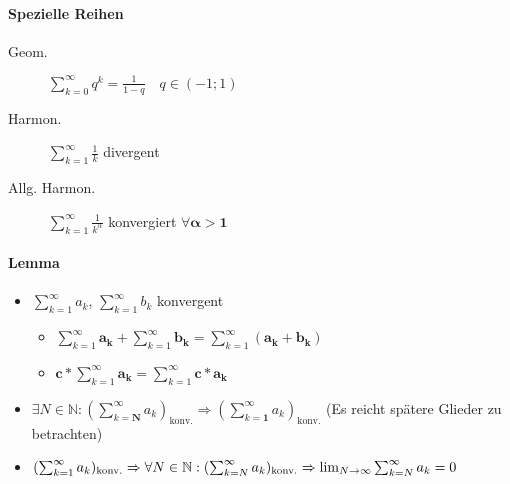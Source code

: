 \paragraph{Spezielle Reihen}

\begin{mzImportant}
  \begin{description}
    \item[Geom.]
      $\sum_{k=0}^\infty q^k = \frac{1}{1- q} \quad q \in (-1;1)$

    \item [Harmon.]
          $\sum_{k=1}^\infty \frac{1}{k}$ divergent

    \item [Allg. Harmon.]
          $\sum_{k=1}^\infty \frac{1}{k^\alpha}$ konvergiert $\forall \mathbf{\alpha > 1}$
  \end{description}
\end{mzImportant}

\paragraph{Lemma}

\begin{itemize}
  \item $\sum_{k=1}^\infty a_k$, $\sum_{k=1}^\infty b_k$ konvergent
        \begin{itemize}
          \item $\sum_{k=1}^\infty \mathbf{a_k} + \sum_{k=1}^\infty \mathbf{b_k} = \sum_{k=1}^\infty (\mathbf{a_k + b_k})$
          \item $\mathbf{c *} \sum_{k=1}^\infty \mathbf{a_k} = \sum_{k=1}^\infty \mathbf{c * a_k}$
        \end{itemize}

  \item $\exists N \in \mathbb{N}: (\sum_{k=\boldsymbol{N}}^\infty a_k)_\text{konv.} \Rightarrow (\sum_{k=\boldsymbol{1}}^\infty a_k)_\text{konv.}$ (Es reicht spätere Glieder zu betrachten)

  \item $(\sum_{k=1}^\infty a_k)_\text{konv.} \linebreak \Rightarrow \forall N \in \mathbb{N}: (\sum_{k=N}^\infty a_k)_\text{konv.} \linebreak \Rightarrow \lim_{N \rightarrow \infty} \sum_{k=N}^\infty a_k = 0$
\end{itemize}

